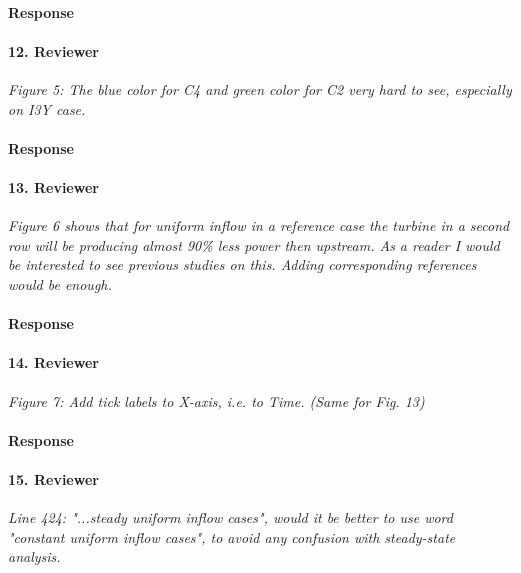 \documentclass[]{article}
\begin{document}
\paragraph{Response} 

\hrulefill

\paragraph{12. Reviewer} \textit{Figure 5: The blue color for C4 and green color for C2 very hard to see, especially on I3Y case.}

\paragraph{Response} 

\hrulefill

\paragraph{13. Reviewer} \textit{Figure 6 shows that for uniform inflow in a reference case the turbine in a second row will be producing almost 90\% less power then upstream. As a reader I would be interested to see previous studies on this. Adding corresponding references would be enough.}

\paragraph{Response} 

\hrulefill

\paragraph{14. Reviewer} \textit{Figure 7: Add tick labels to X-axis, i.e. to Time. (Same for Fig. 13)}

\paragraph{Response} 

\hrulefill

\paragraph{15. Reviewer} \textit{Line 424: "...steady uniform inflow cases", would it be better to use word "constant uniform inflow cases", to avoid any confusion with steady-state analysis.}
\end{document}
